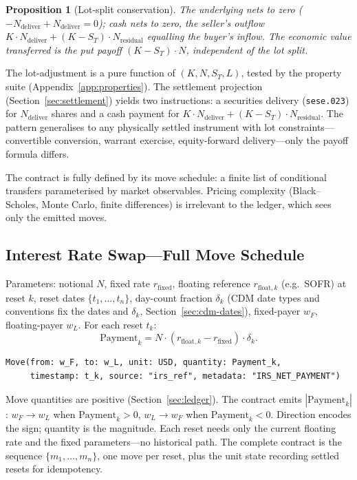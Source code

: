 \documentclass[11pt,a4paper]{article}
\newtheorem{proposition}[definition]{Proposition}
\begin{document}
\begin{proposition}[Lot-split conservation]
The underlying nets to zero ($-N_{\text{deliver}} + N_{\text{deliver}} = 0$); cash nets to zero, the seller's outflow $K\cdot N_{\text{deliver}} + (K-S_T)\cdot N_{\text{residual}}$ equalling the buyer's inflow. The economic value transferred is the put payoff $(K-S_T)\cdot N$, independent of the lot split.
\end{proposition}

\noindent The lot-adjustment is a pure function of $(K, N, S_T, L)$, tested by the property suite (Appendix~\ref{app:properties}). The settlement projection (Section~\ref{sec:settlement}) yields two instructions: a securities delivery (\texttt{sese.023}) for $N_{\text{deliver}}$ shares and a cash payment for $K\cdot N_{\text{deliver}} + (K-S_T)\cdot N_{\text{residual}}$. The pattern generalises to any physically settled instrument with lot constraints---convertible conversion, warrant exercise, equity-forward delivery---only the payoff formula differs.

The contract is fully defined by its move schedule: a finite list of conditional transfers parameterised by market observables. Pricing complexity (Black--Scholes, Monte Carlo, finite differences) is irrelevant to the ledger, which sees only the emitted moves.

\subsection{Interest Rate Swap---Full Move Schedule}

\noindent Parameters: notional $N$, fixed rate $r_{\text{fixed}}$, floating reference $r_{\text{float},k}$ (e.g.\ SOFR) at reset $k$, reset dates $\{t_1,\ldots,t_n\}$, day-count fraction $\delta_k$ (CDM date types and conventions fix the dates and $\delta_k$, Section~\ref{sec:cdm-dates}), fixed-payer $w_F$, floating-payer $w_L$. For each reset $t_k$:
\[
\text{Payment}_k = N \cdot (r_{\text{float},k} - r_{\text{fixed}}) \cdot \delta_k .
\]

\begin{lstlisting}
Move(from: w_F, to: w_L, unit: USD, quantity: Payment_k,
     timestamp: t_k, source: "irs_ref", metadata: "IRS_NET_PAYMENT")
\end{lstlisting}

\noindent Move quantities are positive (Section~\ref{sec:ledger}). The contract emits $|\text{Payment}_k|$: $w_F \to w_L$ when $\text{Payment}_k > 0$, $w_L \to w_F$ when $\text{Payment}_k < 0$. Direction encodes the sign; quantity is the magnitude. Each reset needs only the current floating rate and the fixed parameters---no historical path. The complete contract is the sequence $\{m_1,\ldots,m_n\}$, one move per reset, plus the unit state recording settled resets for idempotency.
\end{document}
